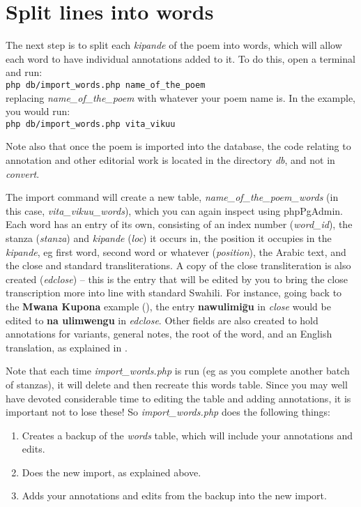 \section{Split lines into words}

The next step is to split each \textit{kipande} of the poem into words, which will allow each word to have individual annotations added to it.  To do this, open a terminal and run:\\
\verb|php db/import_words.php name_of_the_poem|\\
replacing \textit{name_of_the_poem} with whatever your poem name is.  In the example, you would run:\\
\verb|php db/import_words.php vita_vikuu|

Note also that once the poem is imported into the database, the code relating to annotation and other editorial work is located in the directory \textit{db}, and not in \textit{convert}.

The import command will create a new table, \textit{name_of_the_poem_words} (in this case, \textit{vita_vikuu_words}), which you can again inspect using phpPgAdmin.  Each word has an entry of its own, consisting of an index number (\textit{word_id}), the stanza (\textit{stanza}) and \textit{kipande} (\textit{loc}) it occurs in, the position it occupies in the \textit{kipande}, eg first word, second word or whatever (\textit{position}), the Arabic text, and the close and standard transliterations.  A copy of the close transliteration is also created (\textit{edclose}) --  this is the entry that will be edited by you to bring the close transcription more into line with standard Swahili.  For instance, going back to the \textbf{Mwana Kupona} example (), the entry \textbf{nawulimiḡu} in \textit{close} would be edited to \textbf{na ulimwengu} in \textit{edclose}.  Other fields are also created to hold annotations for variants, general notes, the root of the word, and an English translation, as explained in .

Note that each time \textit{import_words.php} is run (eg as you complete another batch of stanzas), it will delete and then recreate this words table.  Since you may well have devoted considerable time to editing the table and adding annotations, it is important not to lose these!  So \textit{import_words.php} does the following things:
\begin{enumerate}
\item Creates a backup of the \textit{words} table, which will include your annotations and edits.
\item Does the new import, as explained above.
\item Adds your annotations and edits from the backup into the new import.
\end{enumerate}


